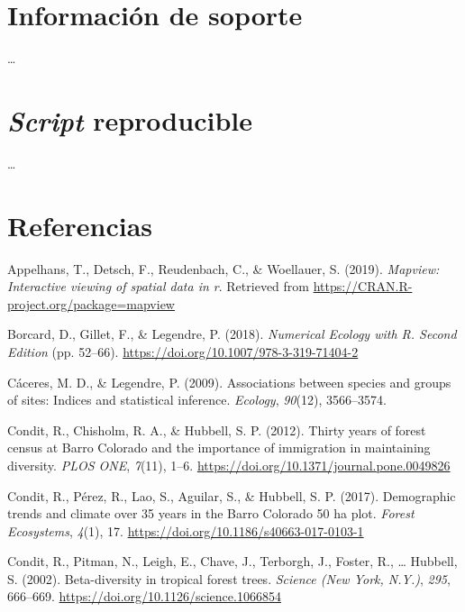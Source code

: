 \documentclass[11pt,]{article}
\begin{document}
\section{Información de soporte}\label{informaciuxf3n-de-soporte}

\ldots

\section{\texorpdfstring{\emph{Script}
reproducible}{Script reproducible}}\label{script-reproducible}

\ldots

\section*{Referencias}\label{referencias}

\hypertarget{refs}{}
\hypertarget{ref-cita_mapview}{}
Appelhans, T., Detsch, F., Reudenbach, C., \& Woellauer, S. (2019).
\emph{Mapview: Interactive viewing of spatial data in r}. Retrieved from
\url{https://CRAN.R-project.org/package=mapview}

\hypertarget{ref-borcard_legendre}{}
Borcard, D., Gillet, F., \& Legendre, P. (2018). \emph{Numerical Ecology
with R. Second Edition} (pp. 52--66).
\url{https://doi.org/10.1007/978-3-319-71404-2}

\hypertarget{ref-caceres2009associations}{}
Cáceres, M. D., \& Legendre, P. (2009). Associations between species and
groups of sites: Indices and statistical inference. \emph{Ecology},
\emph{90}(12), 3566--3574.

\hypertarget{ref-condit_et_al_2012}{}
Condit, R., Chisholm, R. A., \& Hubbell, S. P. (2012). Thirty years of
forest census at Barro Colorado and the importance of immigration in
maintaining diversity. \emph{PLOS ONE}, \emph{7}(11), 1--6.
\url{https://doi.org/10.1371/journal.pone.0049826}

\hypertarget{ref-condit_et_al_2017}{}
Condit, R., Pérez, R., Lao, S., Aguilar, S., \& Hubbell, S. P. (2017).
Demographic trends and climate over 35 years in the Barro Colorado 50 ha
plot. \emph{Forest Ecosystems}, \emph{4}(1), 17.
\url{https://doi.org/10.1186/s40663-017-0103-1}

\hypertarget{ref-article_condit}{}
Condit, R., Pitman, N., Leigh, E., Chave, J., Terborgh, J., Foster, R.,
\ldots{} Hubbell, S. (2002). Beta-diversity in tropical forest trees.
\emph{Science (New York, N.Y.)}, \emph{295}, 666--669.
\url{https://doi.org/10.1126/science.1066854}
\end{document}
